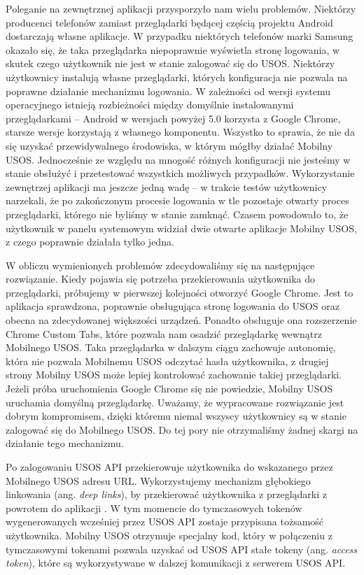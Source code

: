 \documentclass{pracamgr}
\begin{document}
Poleganie na zewnętrznej aplikacji przysporzyło nam wielu problemów. Niektórzy
producenci telefonów zamiast przeglądarki będącej częścią projektu Android
dostarczają własne aplikacje. W przypadku niektórych telefonów marki Samsung
okazało się, że taka przeglądarka niepoprawnie wyświetla stronę logowania, w
skutek czego użytkownik nie jest w stanie zalogować się do USOS. Niektórzy
użytkownicy instalują własne przeglądarki, których konfiguracja nie pozwala na
poprawne działanie mechanizmu logowania. W zależności od wersji systemu operacyjnego
istnieją rozbieżności między domyślnie instalowanymi przeglądarkami -- Android w
wersjach powyżej 5.0 korzysta z Google Chrome, starsze wersje korzystają z własnego
komponentu. Wszystko to sprawia, że nie da się uzyskać przewidywalnego środowiska,
w którym mógłby działać Mobilny USOS. Jednocześnie ze względu na mnogość różnych
konfiguracji nie jesteśmy w stanie obsłużyć i przetestować wszystkich możliwych
przypadków. Wykorzystanie zewnętrzej aplikacji ma jeszcze jedną wadę -- w trakcie
testów użytkownicy narzekali, że po zakończonym procesie logowania w tle pozostaje
otwarty proces przeglądarki, którego nie byliśmy w stanie zamknąć. Czasem powodowało
to, że użytkownik w panelu systemowym widział dwie otwarte aplikacje Mobilny USOS,
z czego poprawnie działała tylko jedna.

W obliczu wymienionych problemów zdecydowaliśmy się na następujące rozwiązanie.
Kiedy pojawia się potrzeba przekierowania użytkownika do przeglądarki, próbujemy
w pierwszej kolejności otworzyć Google Chrome. Jest to aplikacja sprawdzona,
poprawnie obsługująca stronę logowania do USOS oraz obecna na zdecydowanej
większości urządzeń. Ponadto obsługuje ona rozszerzenie Chrome Custom Tabs, które
pozwala nam osadzić przeglądarkę wewnątrz Mobilnego USOS. Taka przeglądarka w
dalszym ciągu zachowuje autonomię, która nie pozwala Mobilnemu USOS odczytać
hasła użytkownika, z drugiej strony Mobilny USOS może lepiej kontrolować zachowanie
takiej przeglądarki. Jeżeli próba uruchomienia Google Chrome się nie powiedzie,
Mobilny USOS uruchamia domyślną przeglądarkę. Uważamy, że wypracowane rozwiązanie
jest dobrym kompromisem, dzięki któremu niemal wszyscy użytkownicy są w stanie
zalogować się do Mobilnego USOS. Do tej pory nie otrzymaliśmy żadnej skargi na
działanie tego mechanizmu.

Po zalogowaniu USOS API przekierowuje użytkownika do wskazanego przez Mobilnego USOS
adresu URL. Wykorzystujemy mechanizm głębokiego linkowania (ang. \textit{deep links}),
by przekierować użytkownika z przeglądarki z powrotem do aplikacji \cite{deeplinks}.
W tym momencie do tymczasowych tokenów wygenerowanych wcześniej przez USOS API zostaje
przypisana tożsamość użytkownika. Mobilny USOS otrzymuje specjalny kod, który w
połączeniu z tymczasowymi tokenami pozwala uzyskać od USOS API stałe tokeny (ang.
\textit{access token}), które są wykorzystywane w dalszej komunikacji z serwerem
USOS API.
\end{document}
